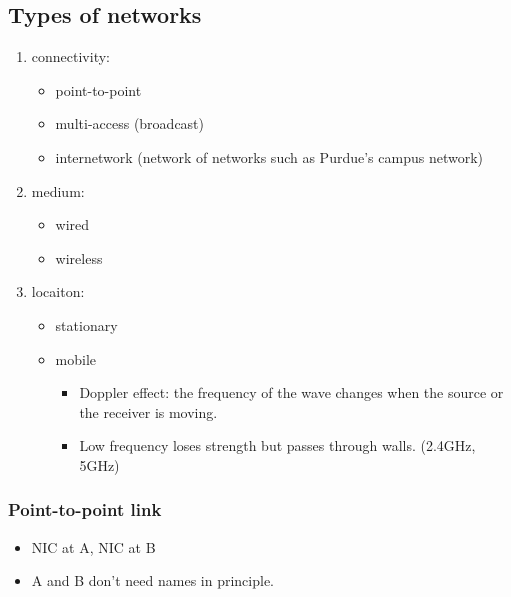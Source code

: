 \documentclass{../../ainote}
\begin{document}
\subsection{Types of networks}
\begin{enumerate}
    \item connectivity:
        \begin{itemize}
            \item point-to-point
            \item multi-access (broadcast)
            \item internetwork (network of networks such as Purdue's campus network)
        \end{itemize}
    \item medium:
        \begin{itemize}
            \item wired
            \item wireless
        \end{itemize}
    \item locaiton:
        \begin{itemize}
            \item stationary
            \item mobile
                \begin{itemize}
                    \item Doppler effect: the frequency of the wave changes when the source or the receiver is moving.
                    \item Low frequency loses strength but passes through walls. (2.4GHz, 5GHz)
                \end{itemize}
        \end{itemize}
\end{enumerate}

\subsubsection{Point-to-point link}
\begin{itemize}[leftmargin=*]
    \item NIC at A, NIC at B
    \item A and B don't need names in principle.
\end{itemize}
\end{document}
